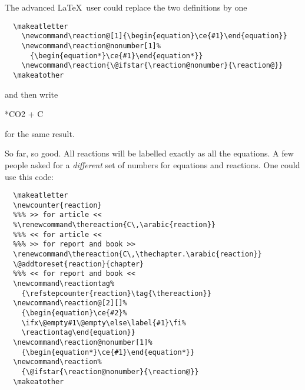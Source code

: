 \documentclass[a4paper,notitlepage,parskip=half]{scrreprt}
\begin{document}
The advanced \LaTeX\ user could replace the two definitions by one
\begin{Verbatim}
  \makeatletter
    \newcommand\reaction@[1]{\begin{equation}\ce{#1}\end{equation}}
    \newcommand\reaction@nonumber[1]%
      {\begin{equation*}\ce{#1}\end{equation*}}
    \newcommand\reaction{\@ifstar{\reaction@nonumber}{\reaction@}}
  \makeatother
\end{Verbatim}

and then write

\makeatletter
  \newcommand\reaction@[1]{\begin{equation}\ce{#1}\end{equation}}
  \newcommand\reaction@nonumber[1]%
    {\begin{equation*}\ce{#1}\end{equation*}}
  \renewcommand\reaction{\@ifstar{\reaction@nonumber}{\reaction@}}
\makeatother
\begin{SideBySideExample}[xrightmargin=5cm]
  \reaction{CO2 + C}
  \reaction*{CO2 + C}
\end{SideBySideExample}

for the same result.

\minisec{}

So far, so good. All reactions will be labelled exactly as all the equations. A few people asked for a \emph{different} set of numbers for equations and reactions. One could use this code:

\begin{Verbatim}
  \makeatletter
  \newcounter{reaction}
  %%% >> for article <<
  %\renewcommand\thereaction{C\,\arabic{reaction}}
  %%% << for article <<
  %%% >> for report and book >>
  \renewcommand\thereaction{C\,\thechapter.\arabic{reaction}}
  \@addtoreset{reaction}{chapter}
  %%% << for report and book <<
  \newcommand\reactiontag%
    {\refstepcounter{reaction}\tag{\thereaction}}
  \newcommand\reaction@[2][]%
    {\begin{equation}\ce{#2}%
    \ifx\@empty#1\@empty\else\label{#1}\fi%
    \reactiontag\end{equation}}
  \newcommand\reaction@nonumber[1]%
    {\begin{equation*}\ce{#1}\end{equation*}}
  \newcommand\reaction%
    {\@ifstar{\reaction@nonumber}{\reaction@}}
  \makeatother
\end{Verbatim}
\end{document}

